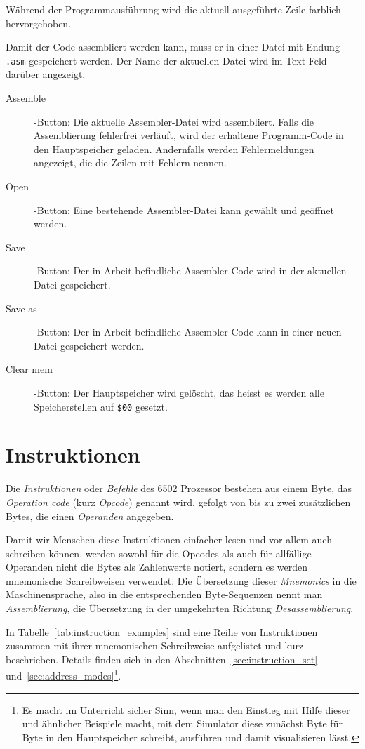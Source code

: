 \documentclass[11pt]{scrartcl}
\newcommand{\hex}[1]{\texttt{\$#1}}
\begin{document}
\begin{itemize}
  Während der Programmausführung wird die aktuell ausgeführte Zeile
  farblich hervorgehoben.

  Damit der Code assembliert werden kann, muss er in einer Datei mit
  Endung \lstinline!.asm! gespeichert werden. Der Name der aktuellen
  Datei wird im Text-Feld darüber angezeigt.
  \begin{description}
  \item[Assemble]-Button: Die aktuelle Assembler-Datei wird
    assembliert.
    Falls die Assemblierung fehlerfrei verläuft, wird der erhaltene
    Programm-Code in den Hauptspeicher geladen.
    Andernfalls werden Fehlermeldungen angezeigt, die die Zeilen mit
    Fehlern nennen.
  \item[Open]-Button: Eine bestehende Assembler-Datei kann gewählt und
    geöffnet werden.
  \item[Save]-Button: Der in Arbeit befindliche Assembler-Code wird in
    der aktuellen Datei gespeichert.
  \item[Save as]-Button: Der in Arbeit befindliche Assembler-Code kann
    in einer neuen Datei gespeichert werden.
  \item[Clear mem]-Button: Der Hauptspeicher wird gelöscht, das heisst
    es werden alle Speicherstellen auf \hex{00} gesetzt.
  \end{description}
\end{itemize}

\newpage

\section{Instruktionen}
\label{sec:instruktionen}


Die \emph{Instruktionen} oder \emph{Befehle} des 6502 Prozessor
bestehen aus einem Byte, das \emph{Operation code} (kurz
\emph{Opcode}) genannt wird, gefolgt von bis zu zwei zusätzlichen
Bytes, die einen \emph{Operanden} angegeben.

Damit wir Menschen diese Instruktionen einfacher lesen und vor allem auch
schreiben können, werden sowohl für die Opcodes als auch für
allfällige Operanden nicht die Bytes als Zahlenwerte notiert, sondern
es werden mnemonische Schreibweisen verwendet.
Die Übersetzung dieser \emph{Mnemonics} in die Maschinensprache, also
in die entsprechenden Byte-Sequenzen nennt man \emph{Assemblierung},
die Übersetzung in der umgekehrten Richtung \emph{Desassemblierung}.


In Tabelle~\ref{tab:instruction_examples} sind eine Reihe von
Instruktionen zusammen mit ihrer mnemonischen Schreibweise aufgelistet
und kurz beschrieben. Details finden sich in den
Abschnitten~\ref{sec:instruction_set}
und~\ref{sec:address_modes}\footnote{Es macht im Unterricht sicher
  Sinn, wenn man den Einstieg mit Hilfe dieser und ähnlicher Beispiele
  macht, mit dem Simulator diese zunächst Byte für Byte in den
  Hauptspeicher schreibt, ausführen und damit visualisieren lässt.}.
\end{document}
